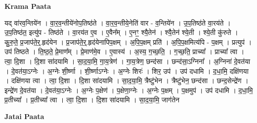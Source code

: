 \documentclass[17pt]{extarticle}
\begin{document}
\textbf{Krama Paata} \newline

यद् वा॑रव॒न्तिये॑न । वा॒र॒व॒न्तीये॑नोप॒तिष्ठ॑ते । वा॒र॒व॒न्तीये॒नेति॑ वार - व॒न्तिये॑न । उ॒प॒तिष्ठ॑ते वा॒रय॑ते । उ॒प॒तिष्ठ॑त॒ इत्यु॑प - तिष्ठ॑ते । वा॒रय॑त ए॒व । ए॒वैन᳚म् । ए॒नꣳ॒॒ श्यै॒तेन॑ । श्यै॒तेन॑ श्ये॒ती । श्ये॒ती कु॑रुते । कु॒रु॒ते॒ प्र॒जाप॑ते॒र्॒.हृद॑येन । प्र॒जाप॑ते॒र्॒.हृद॑येनापिप॒क्षम् । अ॒पि॒प॒क्षम् प्रति॑ । अ॒पि॒प॒क्षमित्य॑पि - प॒क्षम् । प्रत्युप॑ । उप॑ तिष्ठते । ति॒ष्ठ॒ते॒ प्रे॒माण᳚म् । प्रे॒माण॑मे॒व । ए॒वास्य॑ । अ॒स्य॒ ग॒च्छ॒ति॒ । ग॒च्छ॒ति॒ प्राच्या᳚ । प्राच्या᳚ त्वा । त्वा॒ दि॒शा । दि॒शा सा॑दयामि । सा॒द॒या॒मि॒ गा॒य॒त्रेण॑ । गा॒य॒त्रेण॒ छन्द॑सा । छन्द॑सा॒ऽग्निना᳚ । अ॒ग्निना॑ दे॒वत॑या । दे॒वत॑या॒ऽग्नेः । अ॒ग्नेः शी॒र्ष्णा । शी॒र्ष्णाऽग्नेः । अ॒ग्नेः शिरः॑ । शिर॒ उप॑ । उप॑ दधामि । द॒धा॒मि॒ दक्षि॑णया । दक्षि॑णया त्वा । त्वा॒ दि॒शा । दि॒शा सा॑दयामि । सा॒द॒या॒मि॒ त्रैष्टु॑भेन । त्रैष्टु॑भेन॒ छन्द॑सा । छन्द॒सेन्द्रे॑ण । इन्द्रे॑ण दे॒वत॑या । दे॒वत॑या॒ऽग्नेः । अ॒ग्नेः प॒क्षेण॑ । प॒क्षेणा॒ग्नेः । अ॒ग्नेः प॒क्षम् । प॒क्षमुप॑ । उप॑ दधामि । द॒धा॒मि॒ प्र॒तीच्या᳚ । प्र॒तीच्या᳚ त्वा । त्वा॒ दि॒शा । दि॒शा सा॑दयामि । सा॒द॒या॒मि॒ जाग॑तेन \newline

\textbf{Jatai Paata} \newline
\end{document}
